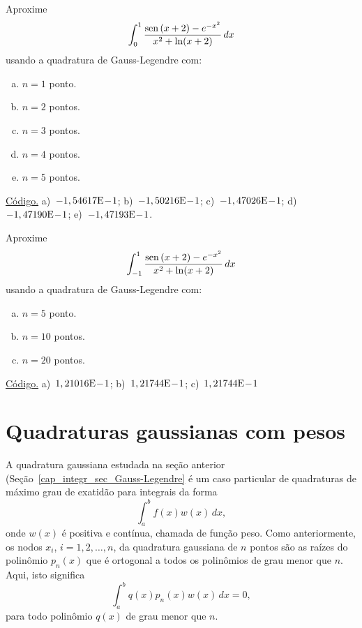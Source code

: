 \begin{exer}\label{exer:GL_mudvar}
  Aproxime
  \begin{equation}
    \int_{0}^1 \frac{\operatorname{sen}\,(x+2)-e^{-x^2}}{x^2+\ln(x+2)}\,dx
  \end{equation}
usando a quadratura de Gauss-Legendre com:
\begin{enumerate}[a)]
\item $n=1$ ponto.
\item $n=2$ pontos.
\item $n=3$ pontos.
\item $n=4$ pontos.
\item $n=5$ pontos.
\end{enumerate}
\end{exer}
\begin{resp}
  \ifisoctave 
  \href{https://github.com/phkonzen/notas/blob/master/src/MatematicaNumerica/cap_integr/dados/exer_GL_mudvar/exer_GL_mudvar.m}{Código.} 
  \fi
  a)~$-1,54617\mathrm{E}\!-\!1$; b)~$-1,50216\mathrm{E}\!-\!1$; c)~$-1,47026\mathrm{E}\!-\!1$; d)~$-1,47190\mathrm{E}\!-\!1$; e)~$-1,47193\mathrm{E}\!-\!1$.
\end{resp}

\begin{exer}\label{exer:GL_Npts}
  Aproxime
  \begin{equation}
    \int_{-1}^1 \frac{\operatorname{sen}\,(x+2)-e^{-x^2}}{x^2+\ln(x+2)}\,dx
  \end{equation}
usando a quadratura de Gauss-Legendre com:
\begin{enumerate}[a)]
\item $n=5$ ponto.
\item $n=10$ pontos.
\item $n=20$ pontos.
\end{enumerate}
\end{exer}
\begin{resp}
  \ifisoctave 
  \href{https://github.com/phkonzen/notas/blob/master/src/MatematicaNumerica/cap_integr/dados/exer_GL_Npts/exer_GL_Npts.m}{Código.} 
  \fi
  a)~$1,21016\mathrm{E}\!-\!1$; b)~$1,21744\mathrm{E}\!-\!1$; c)~$1,21744\mathrm{E}\!-\!1$
\end{resp}

\section{Quadraturas gaussianas com pesos}\label{cap_integr_sec_Gauss_peso}

A quadratura gaussiana estudada na seção anterior (Seção~\ref{cap_integr_sec_Gauss-Legendre} é um caso particular de quadraturas de máximo grau de exatidão para integrais da forma
\begin{equation}
  \int_a^b f(x)w(x)\,dx,
\end{equation}
onde $w(x)$ é positiva e contínua, chamada de função peso. Como anteriormente, os nodos $x_i$, $i=1, 2, \dotsc, n$, da quadratura gaussiana de $n$ pontos são as raízes do polinômio $p_n(x)$ que é ortogonal a todos os polinômios de grau menor que $n$. Aqui, isto significa
\begin{equation}
  \int_a^b q(x)p_n(x)w(x)\,dx = 0,
\end{equation}
para todo polinômio $q(x)$ de grau menor que $n$.


